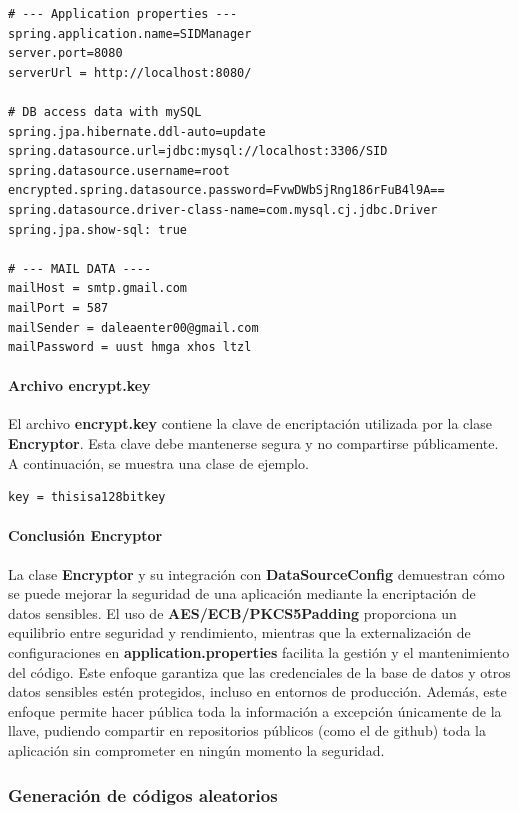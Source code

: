 \documentclass[draft]{scrbook}
\begin{document}
\begin{lstlisting}
# --- Application properties ---
spring.application.name=SIDManager
server.port=8080
serverUrl = http://localhost:8080/

# DB access data with mySQL
spring.jpa.hibernate.ddl-auto=update
spring.datasource.url=jdbc:mysql://localhost:3306/SID
spring.datasource.username=root
encrypted.spring.datasource.password=FvwDWbSjRng186rFuB4l9A==
spring.datasource.driver-class-name=com.mysql.cj.jdbc.Driver
spring.jpa.show-sql: true

# --- MAIL DATA ----
mailHost = smtp.gmail.com
mailPort = 587
mailSender = daleaenter00@gmail.com
mailPassword = uust hmga xhos ltzl
\end{lstlisting}

\paragraph{Archivo encrypt.key}

El archivo \textbf{encrypt.key} contiene la clave de encriptación utilizada por la clase \textbf{Encryptor}. Esta clave debe mantenerse segura y no compartirse públicamente. A continuación, se muestra una clase de ejemplo.

\begin{lstlisting}
key = thisisa128bitkey
\end{lstlisting}

\paragraph{Conclusión Encryptor}

La clase \textbf{Encryptor} y su integración con \textbf{DataSourceConfig} demuestran cómo se puede mejorar la seguridad de una aplicación mediante la encriptación de datos sensibles. El uso de \textbf{AES/ECB/PKCS5Padding} proporciona un equilibrio entre seguridad y rendimiento, mientras que la externalización de configuraciones en \textbf{application.properties} facilita la gestión y el mantenimiento del código. Este enfoque garantiza que las credenciales de la base de datos y otros datos sensibles estén protegidos, incluso en entornos de producción. Además, este enfoque permite hacer pública toda la información a excepción únicamente de la llave, pudiendo compartir en repositorios públicos (como el de github) toda la aplicación sin comprometer en ningún momento la seguridad.


\subsubsection{Generación de códigos aleatorios}
\label{subsec:random-code-generation}
\end{document}
